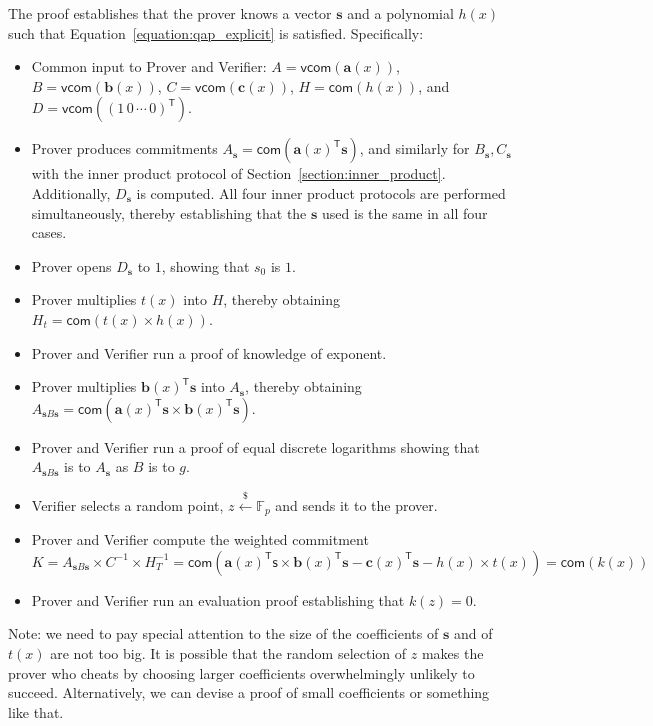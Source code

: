 \documentclass{article}
\begin{document}
The proof establishes that the prover knows a vector $\mathbf{s}$ and a polynomial $h(x)$ such that Equation~\ref{equation:qap_explicit} is satisfied. Specifically:
\begin{itemize}
    \item Common input to Prover and Verifier: $A = \mathsf{vcom}(\mathbf{a}(x))$, $B = \mathsf{vcom}(\mathbf{b}(x))$, $C = \mathsf{vcom}(\mathbf{c}(x))$, $H = \mathsf{com}(h(x))$, and $D = \mathsf{vcom}((1 \, 0 \, \cdots \, 0)^\mathsf{T})$.
    \item Prover produces commitments $A_\mathbf{s} = \mathsf{com}(\mathbf{a}(x)^\mathsf{T} \mathbf{s})$, and similarly for $B_\mathbf{s}, C_\mathbf{s}$ with the inner product protocol of Section~\ref{section:inner_product}. Additionally, $D_\mathbf{s}$ is computed. All four inner product protocols are performed simultaneously, thereby establishing that the $\mathbf{s}$ used is the same in all four cases.
    \item Prover opens $D_\mathbf{s}$ to $1$, showing that $s_0$ is $1$.
    \item Prover multiplies $t(x)$ into $H$, thereby obtaining $H_t = \mathsf{com}(t(x) \times h(x))$.
    \item Prover and Verifier run a proof of knowledge of exponent.
    \item Prover multiplies $\mathbf{b}(x)^\mathsf{T} \mathbf{s}$ into $A_\mathbf{s}$, thereby obtaining $A_{\mathbf{s}B\mathbf{s}} = \mathsf{com}(\mathbf{a}(x)^\mathsf{T} \mathbf{s} \times \mathbf{b}(x)^\mathsf{T} \mathbf{s})$.
    \item Prover and Verifier run a proof of equal discrete logarithms showing that $A_{\mathbf{s}B\mathbf{s}}$ is to $A_\mathbf{s}$ as $B$ is to $g$.
    \item Verifier selects a random point, $z \xleftarrow{\$} \mathbb{F}_p$ and sends it to the prover.
    \item Prover and Verifier compute the weighted commitment $K = A_{\mathbf{s}B\mathbf{s}} \times C^{-1} \times H_T^{-1} = \mathsf{com}(\mathbf{a}(x)^\mathsf{T} \mathsf{s} \times \mathbf{b}(x)^\mathsf{T} \mathbf{s} - \mathbf{c}(x)^\mathsf{T} \mathbf{s} - h(x) \times t(x)) = \mathsf{com}(k(x))$
    \item Prover and Verifier run an evaluation proof establishing that $k(z) = 0$.
\end{itemize}

Note: we need to pay special attention to the size of the coefficients of $\mathbf{s}$ and of $t(x)$ are not too big. It is possible that the random selection of $z$ makes the prover who cheats by choosing larger coefficients overwhelmingly unlikely to succeed. Alternatively, we can devise a proof of small coefficients or something like that.
\end{document}
